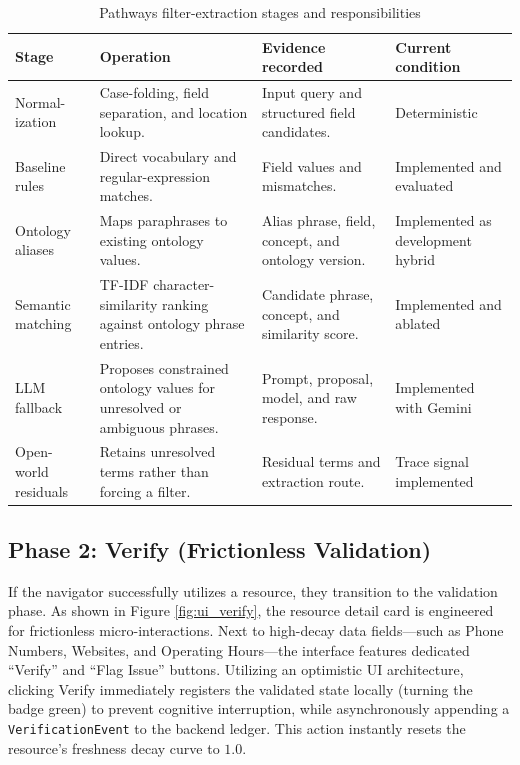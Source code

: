 \documentclass[12pt,oneside]{report}
\begin{document}
\begin{table}[H]
\caption{Pathways filter-extraction stages and responsibilities}
\label{tab:filter_extraction_stages}
\centering
\small
\begin{tabularx}{\textwidth}{@{}p{2.0cm}X p{3.0cm} p{2.7cm}@{}}
\toprule
\textbf{Stage} & \textbf{Operation} & \textbf{Evidence recorded} & \textbf{Current condition} \\
\midrule
\makecell[l]{Normal-\\ization} & Case-folding, field separation, and location lookup. & Input query and structured field candidates. & Deterministic \\
Baseline rules & Direct vocabulary and regular-expression matches. & Field values and mismatches. & Implemented and evaluated \\
Ontology aliases & Maps paraphrases to existing ontology values. & Alias phrase, field, concept, and ontology version. & Implemented as development hybrid \\
Semantic matching & TF-IDF character-similarity ranking against ontology phrase entries. & Candidate phrase, concept, and similarity score. & Implemented and ablated \\
LLM fallback & Proposes constrained ontology values for unresolved or ambiguous phrases. & Prompt, proposal, model, and raw response. & Implemented with Gemini \\
Open-world residuals & Retains unresolved terms rather than forcing a filter. & Residual terms and extraction route. & Trace signal implemented \\
\bottomrule
\end{tabularx}
\end{table}

\subsection{Phase 2: Verify (Frictionless Validation)}
If the navigator successfully utilizes a resource, they transition to the validation phase. As shown in Figure \ref{fig:ui_verify}, the resource detail card is engineered for frictionless micro-interactions. Next to high-decay data fields—such as Phone Numbers, Websites, and Operating Hours—the interface features dedicated ``Verify'' and ``Flag Issue'' buttons. Utilizing an optimistic UI architecture, clicking Verify immediately registers the validated state locally (turning the badge green) to prevent cognitive interruption, while asynchronously appending a \texttt{VerificationEvent} to the backend ledger. This action instantly resets the resource's freshness decay curve to $1.0$.
\end{document}
